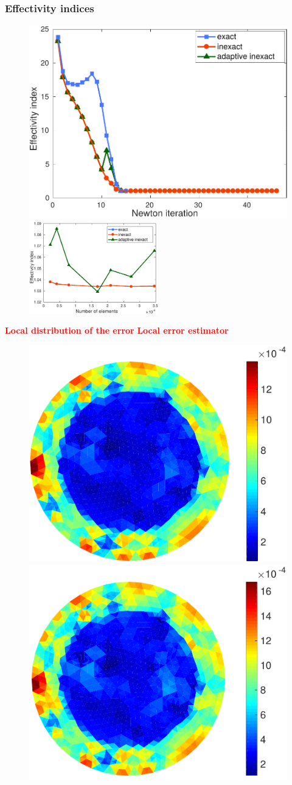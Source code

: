 \documentclass[aspectratio=169]{beamer}
\begin{document}
\begin{frame}
\frametitle{Effectivity indices}
\begin{figure}
\includegraphics[width=0.47 \textwidth]{fig_article_chap_1/effectivity_index_3_methods_Hmax_015.pdf}   \quad 
\includegraphics[width=0.50\textwidth]{fig_article_chap_1/effectivity_index_3_methods_number_elements.eps}     
\end{figure}
\end{frame}
\begin{frame}
 \hspace{1 cm}\textcolor{red}{\textbf{Local distribution of the error}} \hspace{2.5 cm}    \textcolor{red}{\textbf{Local error estimator}}
\begin{figure}
\includegraphics[width=0.47 \textwidth]{fig_article_chap_1/energy_norm_second_level_inexact_newton_iter_30.pdf}  
\includegraphics[width=0.48 \textwidth]{fig_article_chap_1/estimator_actual_error_inexact_newton_iter_30second_level.pdf} 
\end{figure}
\end{frame}
\end{document}
